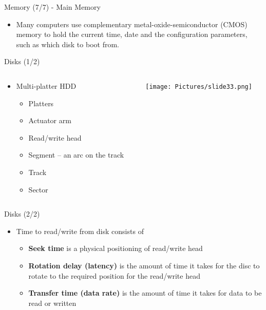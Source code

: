 \documentclass{beamer}
\begin{document}
\begin{frame}
{\centerline{Memory (7/7) - Main Memory}}
\begin{itemize}
    \item Many computers use complementary metal-oxide-semiconductor (CMOS) memory to hold the current time, date and the configuration parameters, such as which disk to boot from.
\end{itemize}
\end{frame}


\begin{frame}
{\centerline{Disks (1/2)}}
\begin{columns}
\begin{column}{.5\linewidth}\centering
\begin{itemize}
    \item Multi-platter HDD
    \begin{itemize}
        \item Platters
        \item Actuator arm
        \item Read/write head 
        \item Segment – an arc on the track
        \item Track
        \item Sector
    \end{itemize}
\end{itemize}
\end{column}
\begin{column}{.5\linewidth}\centering
\texttt{[image: Pictures/slide33.png]}\par 
\end{column}
\end{columns}
\end{frame}


\begin{frame}
{\centerline{Disks (2/2)}}
\begin{itemize}
    \item Time to read/write from disk consists of
    \begin{itemize}
        \item \textbf{Seek time }is a physical positioning of read/write head
        \item \textbf{Rotation delay (latency)} is the amount of time it takes for the disc to rotate to the required position for the read/write head
        \item \textbf{Transfer time (data rate)} is the amount of time it takes for data to be read or written
    \end{itemize}
\end{itemize}
\end{frame}
\end{document}
